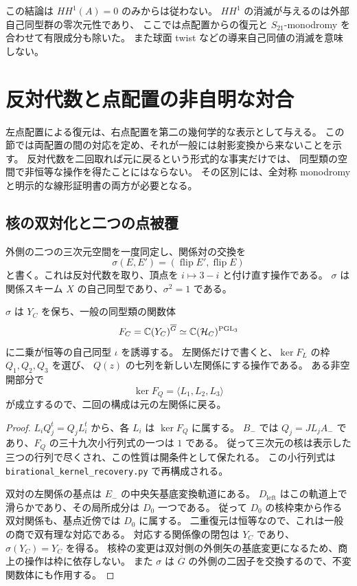この結論は $HH^1(A)=0$ のみからは従わない。
$HH^1$ の消滅が与えるのは外部自己同型群の零次元性であり、
ここでは点配置からの復元と $S_{21}$-monodromy を合わせて有限成分も除いた。
また球面 twist などの導来自己同値の消滅を意味しない。


\section{反対代数と点配置の非自明な対合}
\label{sec:opposite-v23}

左点配置による復元は、右点配置を第二の幾何学的な表示として与える。
この節では両配置の間の対応を定め、それが一般には射影変換から来ないことを示す。
反対代数を二回取れば元に戻るという形式的な事実だけでは、
同型類の空間で非恒等な操作を得たことにはならない。
その区別には、全対称 monodromy と明示的な線形証明書の両方が必要となる。

\subsection{核の双対化と二つの点被覆}

外側の二つの三次元空間を一度同定し、関係対の交換を
\[
 \sigma(E,E')=(\operatorname{flip}E',\operatorname{flip}E)
\]
と書く。これは反対代数を取り、頂点を $i\mapsto3-i$ と付け直す操作である。
$\sigma$ は関係スキーム $X$ の自己同型であり、$\sigma^2=1$ である。

\begin{proposition}[核の二重復元]\label{prop:double-dual-v23}
$\sigma$ は $Y_C$ を保ち、一般の同型類の関数体
\[
 F_C=\mathbb C(Y_C)^{\overline G}
     \simeq\mathbb C(\mathcal H_C)^{\operatorname{PGL}_3}
\]
に二乗が恒等の自己同型 $\iota$ を誘導する。
左関係だけで書くと、$\ker F_L$ の枠 $Q_1,Q_2,Q_3$ を選び、
$Q(z)$ の七列を新しい左関係にする操作である。
ある非空開部分で
\[
 \ker F_Q=\langle L_1,L_2,L_3\rangle
\]
が成立するので、二回の構成は元の左関係に戻る。
\end{proposition}
\begin{proof}
$L_iQ_j^t=Q_jL_i^t$ から、各 $L_i$ は $\ker F_Q$ に属する。
$B_-$ では $Q_j=JL_jA_-$ であり、$F_Q$ の三十九次小行列式の一つは $1$ である。
従って三次元の核は表示した三つの行列で尽くされ、この性質は開条件として保たれる。
この小行列式は \nolinkurl{birational_kernel_recovery.py} で再構成される。

双対の左関係の基点は $E_-$ の中央矢基底変換軌道にある。
$D_{\mathrm{left}}$ はこの軌道上で滑らかであり、その局所成分は $D_0$ 一つである。
従って $D_0$ の核枠束から作る双対関係も、基点近傍では $D_0$ に属する。
二重復元は恒等なので、これは一般の商で双有理な対応である。
対応する関係像の閉包は $Y_C$ であり、$\sigma(Y_C)=Y_C$ を得る。
核枠の変更は双対側の外側矢の基底変更になるため、商上の操作は枠に依存しない。
また $\sigma$ は $\overline G$ の外側の二因子を交換するので、不変関数体にも作用する。
\end{proof}

